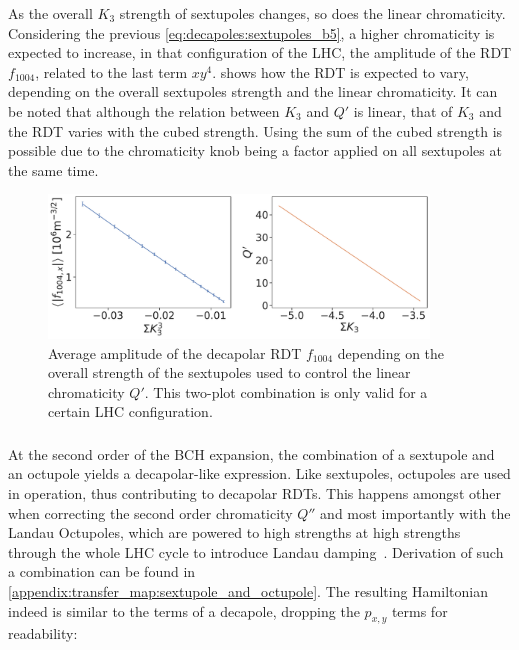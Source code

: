 As the overall $K_3$ strength of sextupoles changes, so does the linear chromaticity. 
Considering the previous \cref{eq:decapoles:sextupoles_b5}, a higher chromaticity
is expected to increase, in that configuration of the LHC, the amplitude of the RDT $f_{1004}$,
related to the last term $xy^4$.  shows how the RDT is
expected to vary, depending on the overall sextupoles strength and the linear chromaticity. It can
be noted that although the relation between $K_3$ and $Q'$ is linear, that of $K_3$ and the RDT
varies with the cubed strength. Using the sum of the cubed strength is possible due to the
chromaticity knob being a factor applied on all sextupoles at the same time.

\begin{figure}[!htb]
    \centering
    \includegraphics[width=0.9\textwidth]{./images/f1004/avg_f1004_k3.pdf}
    \caption{Average amplitude of the decapolar RDT $f_{1004}$ depending on the overall strength
    of the sextupoles used to control the linear chromaticity $Q'$. This two-plot combination is
    only valid for a certain LHC configuration.}
    \label{fig:decapoles:sextupoles_k3_f1004}
\end{figure}




\subsubsection{}


At the second order of the BCH expansion, the combination of a sextupole and an octupole yields a
decapolar-like expression.
Like sextupoles, octupoles are used in operation, thus contributing to decapolar RDTs. This
happens amongst other when correcting the second order chromaticity $Q''$ and most importantly with
the Landau Octupoles, which are powered to high strengths at high strengths through the whole LHC
cycle to introduce Landau damping~\cite{gareyte_landau_1997}.
Derivation of such a combination can be found in
\cref{appendix:transfer_map:sextupole_and_octupole}. The resulting Hamiltonian indeed is similar to
the terms of a decapole, dropping the $p_{x,y}$ terms for readability:

